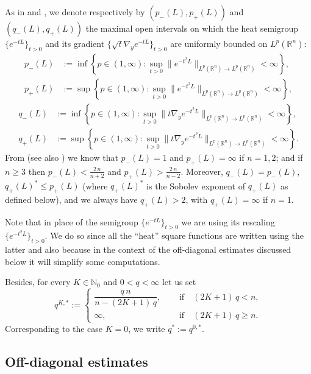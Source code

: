 \documentclass[11pt, a4paper,leqno]{amsart}
\theoremstyle{plain}
\theoremstyle{definition}
\theoremstyle{remark}
\numberwithin{equation}{section}
\begin{document}
As in \cite{Auscher} and \cite{AuscherMartell:II}, we denote respectively by $(p_-(L),p_+(L))$ and $(q_-(L),q_+(L))$ the maximal open intervals on which the heat semigroup $\{e^{-tL}\}_{t>0}$ and its 
gradient $\{\sqrt{t}\nabla_y e^{-tL}\}_{t>0}$
are uniformly bounded on $L^p(\mathbb{R}^n)$:
\begin{align}\label{p-}
p_-(L) &:= \inf\left\{p\in(1,\infty): \sup_{t>0} \|e^{-t^2L}\|_{L^p(\mathbb{R}^n)\rightarrow L^p(\mathbb{R}^n)}< \infty\right\},
\\[4pt]
p_+(L)& := \sup\left\{p\in(1,\infty) : \sup_{t>0} \|e^{-t^2L}\|_{L^p(\mathbb{R}^n)\rightarrow L^p(\mathbb{R}^n)}< \infty\right\},
\label{p+}
\end{align}
%
\begin{align}\label{q-}
q_-(L) &:= \inf\left\{p\in(1,\infty): \sup_{t>0} \|t\nabla_y e^{-t^2L} \|_{L^p(\mathbb{R}^n)\rightarrow L^p(\mathbb{R}^n)}< \infty\right\},
\\[4pt]
q_+(L)& := \sup\left\{p\in(1,\infty) : \sup_{t>0} \|t\nabla_y e^{-t^2L} \|_{L^p(\mathbb{R}^n)\rightarrow L^p(\mathbb{R}^n)}< \infty\right\}.\label{q+}
\end{align}
From \cite{Auscher} (see also \cite{AuscherMartell:II}) we know that $p_-(L)=1$ and  $p_+(L)=\infty$ if $n=1,2$; and if $n\ge 3$ then $p_-(L)<\frac{2\,n}{n+2}$ and $p_+(L)>\frac{2\,n}{n-2}$. Moreover, $q_-(L)=p_-(L)$, $ q_+(L)^*\le p_+(L)$ (where $q_+(L)^*$ is the Sobolev exponent of $q_+(L)$ as defined below), and we always have $q_+(L)>2$, with $q_+(L)=\infty$ if $n=1$.

Note that in place of the semigroup $\{e^{-t L}\}_{t>0}$ we are using its rescaling $\{e^{-t^2 L}\}_{t>0}$. We do so since all the ``heat'' square functions are written using the latter and also because in the context of the off-diagonal estimates discussed below it will simplify some computations.

Besides, for every $K\in\mathbb{N}_0$ and $0<q<\infty$ let us set
$$
q^{K,*}:=
\left\{
\begin{array}{ll}
\dfrac{q\,n}{n-(2K+1)\,q}, &\quad\mbox{ if}\quad(2K+1)\,q<n,
\\[10pt]
\infty, &\quad\mbox{ if}\quad(2K+1)\,q\ge n.
\end{array}
\right.
$$
Corresponding to the case $K=0$, we write $q^{*}:=q^{0,*}$.
\subsection{Off-diagonal estimates}\label{section:OD}
\end{document}

